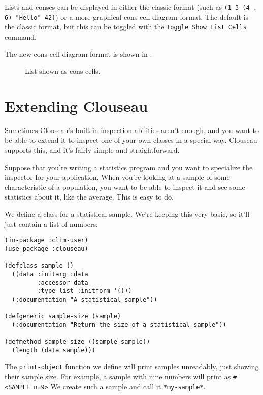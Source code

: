 Lists and conses can be displayed in either the classic format (such as
\texttt{(1 3 (4 . 6) "Hello" 42)}) or a more graphical cons-cell diagram
format. The default is the classic format, but this can be toggled with
the \texttt{Toggle Show List Cells} command.

The new cons cell diagram format is shown in .

\begin{figure}
\begin{center}
\end{center}
\caption{\label{fig-cell-diagram}
List shown as cons cells.}
\end{figure}

\section{Extending Clouseau}

Sometimes Clouseau's built-in inspection abilities aren't enough, and
you want to be able to extend it to inspect one of your own classes in a
special way. Clouseau supports this, and it's fairly simple and
straightforward.

Suppose that you're writing a statistics program and you want to
specialize the inspector for your application. When you're looking at a
sample of some characteristic of a population, you want to be able to
inspect it and see some statistics about it, like the average. This is
easy to do.

We define a class for a statistical sample. We're keeping this very
basic, so it'll just contain a list of numbers:

\begin{verbatim}
(in-package :clim-user)
(use-package :clouseau)

(defclass sample ()
  ((data :initarg :data
         :accessor data
         :type list :initform '()))
  (:documentation "A statistical sample"))

(defgeneric sample-size (sample)
  (:documentation "Return the size of a statistical sample"))

(defmethod sample-size ((sample sample))
  (length (data sample)))
\end{verbatim}

The \texttt{print-object} function we define will print samples
unreadably, just showing their sample size. For example, a sample with
nine numbers will print as \texttt{\#<SAMPLE n=9>} We create such a sample
and call it \texttt{*my-sample*}.

